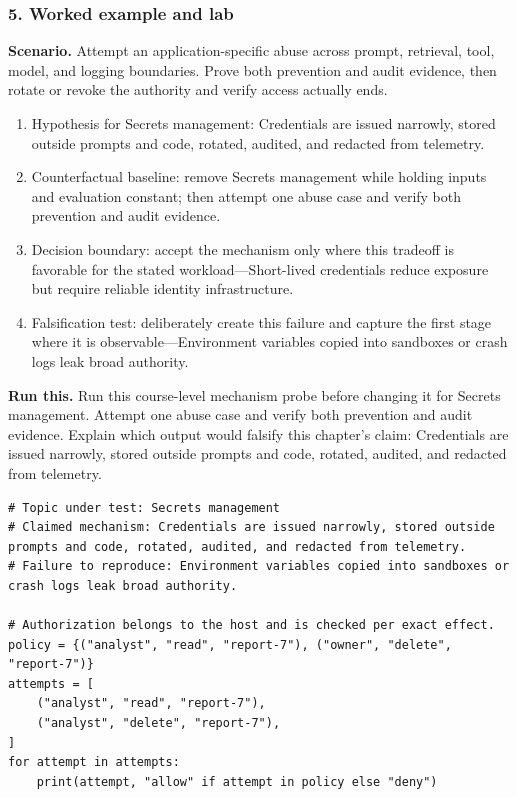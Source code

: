 \subsubsection*{5. Worked example and lab}
\textbf{Scenario.} Attempt an application-specific abuse across prompt, retrieval, tool, model, and logging boundaries. Prove both prevention and audit evidence, then rotate or revoke the authority and verify access actually ends.
\begin{enumerate}
\item Hypothesis for Secrets management: Credentials are issued narrowly, stored outside prompts and code, rotated, audited, and redacted from telemetry.
\item Counterfactual baseline: remove Secrets management while holding inputs and evaluation constant; then attempt one abuse case and verify both prevention and audit evidence.
\item Decision boundary: accept the mechanism only where this tradeoff is favorable for the stated workload—Short-lived credentials reduce exposure but require reliable identity infrastructure.
\item Falsification test: deliberately create this failure and capture the first stage where it is observable—Environment variables copied into sandboxes or crash logs leak broad authority.
\end{enumerate}
\textbf{Run this.} Run this course-level mechanism probe before changing it for Secrets management. Attempt one abuse case and verify both prevention and audit evidence. Explain which output would falsify this chapter's claim: Credentials are issued narrowly, stored outside prompts and code, rotated, audited, and redacted from telemetry.
\begin{Verbatim}[fontsize=\scriptsize]
# Topic under test: Secrets management
# Claimed mechanism: Credentials are issued narrowly, stored outside prompts and code, rotated, audited, and redacted from telemetry.
# Failure to reproduce: Environment variables copied into sandboxes or crash logs leak broad authority.

# Authorization belongs to the host and is checked per exact effect.
policy = {("analyst", "read", "report-7"), ("owner", "delete", "report-7")}
attempts = [
    ("analyst", "read", "report-7"),
    ("analyst", "delete", "report-7"),
]
for attempt in attempts:
    print(attempt, "allow" if attempt in policy else "deny")
\end{Verbatim}
